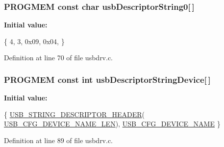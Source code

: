 \hypertarget{mhvlib-_vusb-_keyboard_2vusb_2usbdrv_8c_a367afe22c903b4b58805cc451c22cb99}{
\subsubsection[{usb\-Descriptor\-String0}]{\setlength{\rightskip}{0pt plus 5cm}P\-R\-O\-G\-M\-E\-M const char usb\-Descriptor\-String0\mbox{[}$\,$\mbox{]}}}\label{mhvlib-_vusb-_keyboard_2vusb_2usbdrv_8c_a367afe22c903b4b58805cc451c22cb99}
{\bfseries Initial value\-:}
\begin{DoxyCode}
 \{ 
    4,          
    3,          
    0x09, 0x04, 
\}
\end{DoxyCode}


Definition at line 70 of file usbdrv.\-c.

\hypertarget{mhvlib-_vusb-_keyboard_2vusb_2usbdrv_8c_a1f252008bbf46a3172ebf8a4f8213a60}{
\subsubsection[{usb\-Descriptor\-String\-Device}]{\setlength{\rightskip}{0pt plus 5cm}P\-R\-O\-G\-M\-E\-M const int usb\-Descriptor\-String\-Device\mbox{[}$\,$\mbox{]}}}\label{mhvlib-_vusb-_keyboard_2vusb_2usbdrv_8c_a1f252008bbf46a3172ebf8a4f8213a60}
{\bfseries Initial value\-:}
\begin{DoxyCode}
 \{
    \hyperlink{mhvlib-_vusb-_keyboard_2vusb_2usbdrv_8h_ad94ebd3045d80d1e2ab32c22be4ff96e}{USB\_STRING\_DESCRIPTOR\_HEADER}(
      \hyperlink{mhvlib-_vusb-_keyboard_2vusb_2usbconfig-prototype_8h_ae68f17e6baf13805abc56e74beadeb57}{USB\_CFG\_DEVICE\_NAME\_LEN}),
    \hyperlink{mhvlib-_vusb-_keyboard_2vusb_2usbconfig-prototype_8h_a9b482a2b2740652ffe7dcb6695ca0c91}{USB\_CFG\_DEVICE\_NAME}
\}
\end{DoxyCode}


Definition at line 89 of file usbdrv.\-c.


